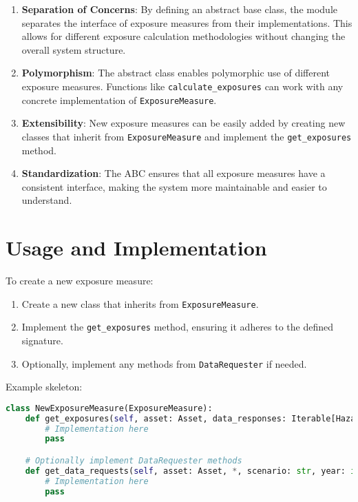 \documentclass{article}
\begin{document}
\begin{enumerate}
    \item \textbf{Separation of Concerns}: 
    By defining an abstract base class, the module separates the interface of exposure measures from their implementations. This allows for different exposure calculation methodologies without changing the overall system structure.

    \item \textbf{Polymorphism}: 
    The abstract class enables polymorphic use of different exposure measures. Functions like \texttt{calculate\_exposures} can work with any concrete implementation of \texttt{ExposureMeasure}.

    \item \textbf{Extensibility}: 
    New exposure measures can be easily added by creating new classes that inherit from \texttt{ExposureMeasure} and implement the \texttt{get\_exposures} method.

    \item \textbf{Standardization}: 
    The ABC ensures that all exposure measures have a consistent interface, making the system more maintainable and easier to understand.
\end{enumerate}

\section{Usage and Implementation}

To create a new exposure measure:

\begin{enumerate}
    \item Create a new class that inherits from \texttt{ExposureMeasure}.
    \item Implement the \texttt{get\_exposures} method, ensuring it adheres to the defined signature.
    \item Optionally, implement any methods from \texttt{DataRequester} if needed.
\end{enumerate}

Example skeleton:

\begin{lstlisting}[language=Python]
class NewExposureMeasure(ExposureMeasure):
    def get_exposures(self, asset: Asset, data_responses: Iterable[HazardDataResponse]) -> Dict[type, Tuple[Category, float, str]]:
        # Implementation here
        pass

    # Optionally implement DataRequester methods
    def get_data_requests(self, asset: Asset, *, scenario: str, year: int) -> Iterable[HazardDataRequest]:
        # Implementation here
        pass
\end{lstlisting}
\end{document}
